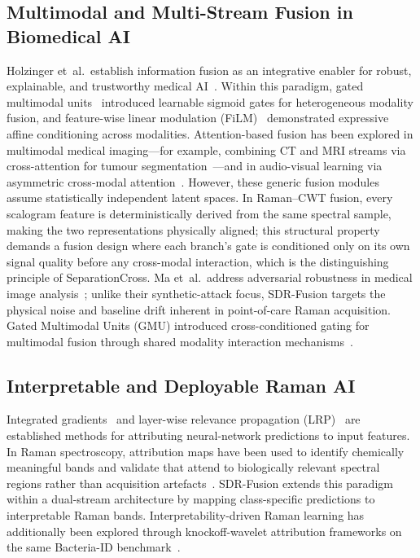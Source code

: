 \documentclass[preprint,12pt]{elsarticle}
\begin{document}
\subsection{Multimodal and Multi-Stream Fusion in Biomedical AI}
\label{ssec:fusion}

Holzinger et~al.\ establish information fusion as an integrative enabler
for robust, explainable, and trustworthy medical
AI~\cite{holzinger2022information}. Within this paradigm, gated
multimodal units~\cite{arevalo2017gated} introduced learnable sigmoid
gates for heterogeneous modality fusion, and feature-wise linear
modulation (FiLM)~\cite{perez2018film} demonstrated expressive affine
conditioning across modalities. Attention-based fusion has been explored
in multimodal medical imaging---for example, combining CT and MRI
streams via cross-attention for tumour
segmentation~\cite{holzinger2022information}---and in audio-visual
learning via asymmetric cross-modal
attention~\cite{vaswani2017attention}. However, these generic fusion
modules assume statistically independent latent spaces. In Raman--CWT
fusion, every scalogram feature is deterministically derived from the
same spectral sample, making the two representations physically aligned;
this structural property demands a fusion design where each branch's
gate is conditioned only on its own signal quality before any
cross-modal interaction, which is the distinguishing principle of
SeparationCross. Ma et~al.\ address adversarial robustness in medical
image analysis~\cite{ma2021understanding}; unlike their synthetic-attack
focus, SDR-Fusion targets the physical noise and baseline drift inherent
in point-of-care Raman acquisition. Gated Multimodal Units (GMU) introduced cross-conditioned gating for
multimodal fusion through shared modality interaction
mechanisms~\cite{arevalo2017gated}.

\subsection{Interpretable and Deployable Raman AI}
\label{ssec:interp_edge}

Integrated gradients~\cite{sundararajan2017axiomatic} and layer-wise
relevance propagation (LRP)~\cite{bach2015pixel} are established
methods for attributing neural-network predictions to input features.
In Raman spectroscopy, attribution maps have been used to identify
chemically meaningful bands and validate that attend to
biologically relevant spectral regions rather than acquisition
artefacts~\cite{lussier2020deep,singh2022culture,chia2021interpretable}.
SDR-Fusion extends this paradigm within a dual-stream architecture by
mapping class-specific predictions to interpretable Raman bands. Interpretability-driven Raman learning has additionally been explored
through knockoff-wavelet attribution frameworks on the same
Bacteria-ID benchmark~\cite{chia2021interpretable}.
\end{document}
